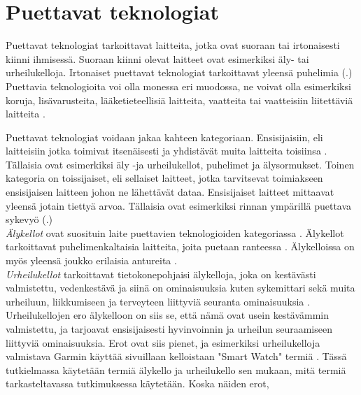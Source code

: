 \documentclass[utf8,bachelor,finnish]{bachelor}
\begin{document}
   
\chapter{Puettavat teknologiat}

  Puettavat teknologiat tarkoittavat laitteita, jotka ovat suoraan tai irtonaisesti
   kiinni ihmisessä. Suoraan kiinni olevat laitteet ovat esimerkiksi äly- tai urheilukelloja.
    Irtonaiset puettavat teknologiat tarkoittavat yleensä puhelimia (\cite{godfrey2018z}.) Puettavia teknologioita voi olla
     monessa eri muodossa, ne voivat olla esimerkiksi koruja, lisävarusteita, lääketieteellisiä laitteita, vaatteita tai
      vaatteisiin liitettäviä laitteita \parencite{Yasar_what_wearable}.
    
  Puettavat teknologiat voidaan jakaa kahteen kategoriaan. Ensisijaisiin, eli laitteisiin jotka toimivat itsenäisesti
   ja yhdistävät muita laitteita toisiinsa \parencite{godfrey2018z}. Tällaisia ovat esimerkiksi äly -ja urheilukellot, puhelimet ja älysormukset.
    Toinen kategoria on toissijaiset, eli sellaiset laitteet, jotka tarvitsevat toimiakseen ensisijaisen laitteen johon ne lähettävät dataa. 
     Ensisijaiset laitteet mittaavat yleensä jotain tiettyä arvoa. Tällaisia ovat esimerkiksi rinnan ympärillä puettava sykevyö (\cite{godfrey2018z}.) \\

  \emph{Älykellot} ovat suosituin laite puettavien teknologioiden kategoriassa \parencite{godfrey2018z}.
   Älykellot tarkoittavat puhelimenkaltaisia laitteita, joita puetaan ranteessa \parencite{Gregersen_watch_2023}.
    Älykelloissa on myös yleensä joukko erilaisia antureita \parencite{rawassizadeh_wearables_2014}.\\

  \emph{Urheilukellot} tarkoittavat tietokonepohjaisi älykelloja, joka on kestävästi valmistettu, vedenkestävä ja siinä on ominaisuuksia kuten
    sykemittari sekä muita urheiluun, liikkumiseen ja terveyteen liittyviä seuranta ominaisuuksia \parencite{sportswatch_tfd}. Urheilukellojen ero älykelloon on siis se,
     että nämä ovat usein kestävämmin valmistettu, ja tarjoavat ensisijaisesti hyvinvoinnin ja urheilun seuraamiseen liittyviä ominaisuuksia. Erot ovat siis pienet, 
      ja esimerkiksi urheilukelloja valmistava Garmin käyttää sivuillaan kelloistaan "Smart Watch" termiä \parencite{garmin_site}. Tässä tutkielmassa
       käytetään termiä älykello ja urheilukello sen mukaan, mitä termiä tarkasteltavassa tutkimuksessa käytetään. Koska näiden erot,  \\
  
\end{document}
